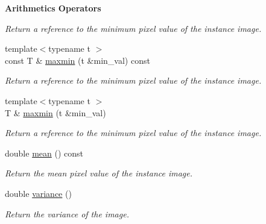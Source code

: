 \begin{Indent}{\bf Arithmetics Operators}
\begin{DoxyCompactItemize}
\begin{DoxyCompactList}\small\item\em Return a reference to the minimum pixel value of the instance image. \end{DoxyCompactList}\item 
\hypertarget{structcimg__library_1_1_c_img_list_aca5051a5f64dc8206003c9429495b15a}{{\footnotesize template$<$typename t $>$ }\\const T \& \hyperlink{structcimg__library_1_1_c_img_list_aca5051a5f64dc8206003c9429495b15a}{maxmin} (t \&min\-\_\-val) const }\label{structcimg__library_1_1_c_img_list_aca5051a5f64dc8206003c9429495b15a}

\begin{DoxyCompactList}\small\item\em Return a reference to the minimum pixel value of the instance image. \end{DoxyCompactList}\item 
\hypertarget{structcimg__library_1_1_c_img_list_a978ed137b9b332061c58d16668058377}{{\footnotesize template$<$typename t $>$ }\\T \& \hyperlink{structcimg__library_1_1_c_img_list_a978ed137b9b332061c58d16668058377}{maxmin} (t \&min\-\_\-val)}\label{structcimg__library_1_1_c_img_list_a978ed137b9b332061c58d16668058377}

\begin{DoxyCompactList}\small\item\em Return a reference to the minimum pixel value of the instance image. \end{DoxyCompactList}\item 
\hypertarget{structcimg__library_1_1_c_img_list_ae5536f75811f232a043338f1237eb6dc}{double \hyperlink{structcimg__library_1_1_c_img_list_ae5536f75811f232a043338f1237eb6dc}{mean} () const }\label{structcimg__library_1_1_c_img_list_ae5536f75811f232a043338f1237eb6dc}

\begin{DoxyCompactList}\small\item\em Return the mean pixel value of the instance image. \end{DoxyCompactList}\item 
\hypertarget{structcimg__library_1_1_c_img_list_a71be915ef3342e64e791fbe851b6edcf}{double \hyperlink{structcimg__library_1_1_c_img_list_a71be915ef3342e64e791fbe851b6edcf}{variance} ()}\label{structcimg__library_1_1_c_img_list_a71be915ef3342e64e791fbe851b6edcf}

\begin{DoxyCompactList}\small\item\em Return the variance of the image. \end{DoxyCompactList}\end{DoxyCompactItemize}
\end{Indent}
